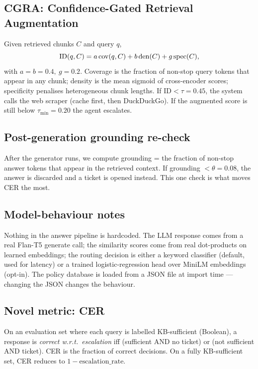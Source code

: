 \documentclass[11pt,a4paper]{article}
\begin{document}
\subsection{CGRA: Confidence-Gated Retrieval Augmentation}
\label{sec:cgra}
Given retrieved chunks $C$ and query $q$,
\begin{equation*}
\small
\mathrm{ID}(q,C) = a\,\mathrm{cov}(q,C) + b\,\mathrm{den}(C) + g\,\mathrm{spec}(C),
\end{equation*}
with $a{=}b{=}0.4,\ g{=}0.2$. Coverage is the fraction of non-stop query tokens that appear in any chunk; density is the mean sigmoid of cross-encoder scores; specificity penalises heterogeneous chunk lengths. If $\mathrm{ID} < \tau{=}0.45$, the system calls the web scraper (cache first, then DuckDuckGo). If the augmented score is still below $\tau_{\min}{=}0.20$ the agent escalates.

\subsection{Post-generation grounding re-check}
After the generator runs, we compute grounding = the fraction of non-stop answer tokens that appear in the retrieved context. If grounding $< \theta{=}0.08$, the answer is discarded and a ticket is opened instead. This one check is what moves CER the most.

\subsection{Model-behaviour notes}
Nothing in the answer pipeline is hardcoded. The LLM response comes from a real Flan-T5 generate call; the similarity scores come from real dot-products on learned embeddings; the routing decision is either a keyword classifier (default, used for latency) or a trained logistic-regression head over MiniLM embeddings (opt-in). The policy database is loaded from a JSON file at import time --- changing the JSON changes the behaviour.

\subsection{Novel metric: CER}
\label{sec:metrics}
On an evaluation set where each query is labelled KB-sufficient (Boolean), a response is \emph{correct w.r.t.\ escalation} iff (sufficient AND no ticket) or (not sufficient AND ticket). CER is the fraction of correct decisions. On a fully KB-sufficient set, CER reduces to $1-\mathrm{escalation\_rate}$.
\end{document}
